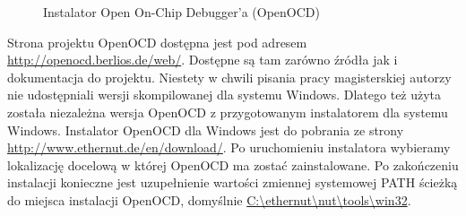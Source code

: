 \begin{figure}[h!]
 \centering
 \hfill
 \caption{Instalator Open On-Chip Debugger'a (OpenOCD)}
 \label{fig:openocd-win32-install}
\end{figure}

Strona projektu OpenOCD dostępna jest pod adresem
\url{http://openocd.berlios.de/web/}. Dostępne są tam zarówno źródła jak i
dokumentacja do projektu. Niestety w chwili pisania pracy magisterskiej autorzy
nie udostępniali wersji skompilowanej dla systemu Windows. Dlatego też użyta
została niezależna wersja OpenOCD z przygotowanym instalatorem dla systemu
Windows. Instalator OpenOCD dla Windows jest do pobrania ze strony
\url{http://www.ethernut.de/en/download/}. Po uruchomieniu instalatora wybieramy
lokalizację docelową w której OpenOCD ma zostać zainstalowane. Po zakończeniu
instalacji konieczne jest uzupełnienie wartości zmiennej systemowej PATH ścieżką
do miejsca instalacji OpenOCD, domyślnie \url{C:\ethernut\nut\tools\win32}.

